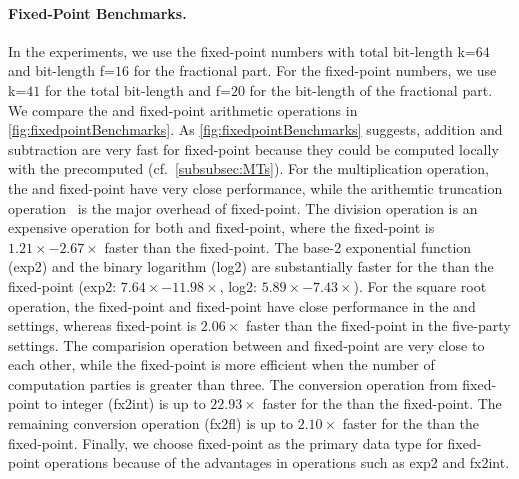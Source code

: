 \paragraph{Fixed-Point Benchmarks.}
\label{para:Fixed-PointBenchmarking}
In the experiments, we use the \booleanGMW fixed-point numbers with total bit-length k=$64$ and bit-length f=$16$ for the fractional part.
For the \arithmeticGMW fixed-point numbers, we use k=$41$ for the total bit-length and f=$20$ for the bit-length of the fractional part.
We compare the \booleanGMW and \arithmeticGMW fixed-point arithmetic operations in \autoref{fig:fixedpointBenchmarks}. As \autoref{fig:fixedpointBenchmarks} suggests, addition and subtraction are very fast for \arithmeticGMW fixed-point because they could be computed locally with the precomputed \mts (cf.~\autoref{subsubsec:MTs}). For the multiplication operation, the \booleanGMW and \arithmeticGMW fixed-point have very close performance, while the arithemtic truncation operation~\cite{catrina2010secure} is the major overhead of \arithmeticGMW fixed-point. The division operation is an expensive operation for both \booleanGMW and \arithmeticGMW fixed-point, where the \arithmeticGMW fixed-point is $1.21\times-2.67\times$ faster than the \booleanGMW fixed-point. The base-2 exponential function (exp2) and the binary logarithm (log2) are substantially faster for the \booleanGMW than the \arithmeticGMW fixed-point (exp2: $7.64\times-11.98\times$, log2: $5.89\times-7.43\times$). For the square root operation, the \booleanGMW fixed-point and \arithmeticGMW fixed-point have close performance in the \twopc and \threepc settings, whereas \booleanGMW fixed-point is $2.06\times$ faster than the \arithmeticGMW fixed-point in the five-party settings. The comparision operation between \booleanGMW and \arithmeticGMW fixed-point are very close to each other, while the \booleanGMW fixed-point is more efficient when the number of computation parties is greater than three. The conversion operation from fixed-point to integer (fx2int) is up to $22.93\times$ faster for the \booleanGMW than the \arithmeticGMW fixed-point. The remaining conversion operation (fx2fl) is up to $2.10\times$ faster for the \arithmeticGMW than the \booleanGMW fixed-point.
Finally, we choose \booleanGMW fixed-point as the primary data type for fixed-point operations because of the advantages in operations such as exp2 and fx2int.


